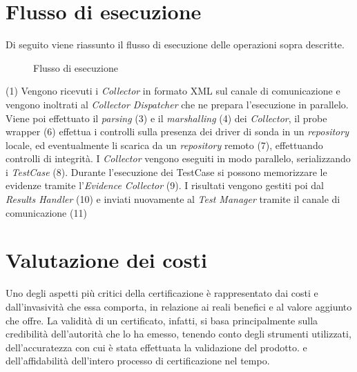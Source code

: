 \documentclass[../main.tex]{subfiles}
\begin{document}
\section{Flusso di esecuzione}
Di seguito viene riassunto il flusso di esecuzione delle operazioni sopra descritte.
\begin{figure}[H]
\centering
{}
\caption{Flusso di esecuzione}\label{fig:ExecutionFlow}
\end{figure}
(1) Vengono ricevuti i \textit{Collector} in formato XML sul canale di comunicazione e vengono inoltrati al \textit{Collector Dispatcher} che ne prepara l'esecuzione in parallelo.
Viene poi effettuato il \textit{parsing} (3) e il \textit{marshalling} (4) dei \textit{Collector}, il probe wrapper (6) effettua i controlli sulla presenza dei driver di sonda in un \textit{repository} locale, ed eventualmente li scarica da un \textit{repository} remoto (7), effettuando controlli di integrità.
I \textit{Collector} vengono eseguiti in modo parallelo, serializzando i \textit{TestCase} (8). Durante l'esecuzione dei TestCase si possono memorizzare le evidenze tramite l'\textit{Evidence Collector} (9). I risultati vengono gestiti poi dal \textit{Results Handler} (10) e inviati nuovamente al \textit{Test Manager} tramite il canale di comunicazione (11)

\section{Valutazione dei costi}
Uno degli aspetti più critici della certificazione è rappresentato dai costi e dall'invasività che essa comporta, in relazione ai reali benefici e al valore aggiunto che offre.
La validità di un certificato, infatti, si basa principalmente sulla credibilità dell'autorità che lo ha emesso, tenendo conto degli strumenti utilizzati, dell'accuratezza con cui è stata effettuata la validazione del prodotto. e dell'affidabilità dell'intero processo di certificazione nel tempo.
\end{document}
